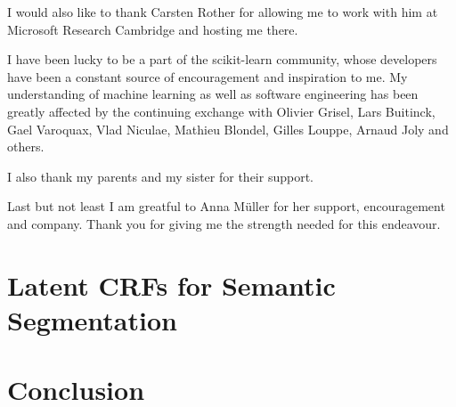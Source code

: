 \documentclass[12pt,toc=bibnumbered, a4paper,twoside,DIV=calc]{scrbook}
\begin{document}
I would also like to thank Carsten Rother for allowing me to work with him
at Microsoft Research Cambridge and hosting me there.

I have been lucky to be a part of the scikit-learn community, whose developers
have been a constant source of encouragement and inspiration to me. My
understanding of machine learning as well as software engineering has been
greatly affected by the continuing exchange with Olivier Grisel, Lars Buitinck,
Gael Varoquax, Vlad Niculae, Mathieu Blondel, Gilles Louppe, Arnaud Joly and
others.

I also thank my parents and my sister for their support.

Last but not least I am greatful to Anna M\"uller for her support,
encouragement and company. Thank you for giving me the strength needed for this
endeavour.















\chapter{Latent CRFs for Semantic Segmentation}\label{ch:latent}

\chapter{Conclusion}



\end{document}
